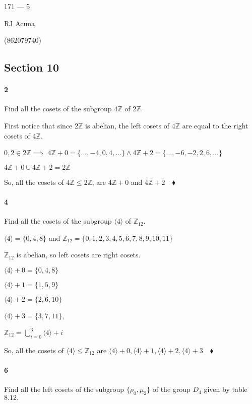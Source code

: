 \documentclass{article}
\newcommand\Z{\mathbb{Z}}
\begin{document}
\begin{center}
  171 --- 5

  RJ Acuna

  (862079740)
\end{center}\vspace{1.618em}


\subsection*{Section 10}

\paragraph{2} Find all the cosets of the subgroup $4\Z$ of $2\Z$.


First notice that since $2\Z$ is abelian, the left cosets
of $4\Z$ are equal to the right cosets of $4\Z$.

$0,2 \in 2\Z \implies$
$4\Z + 0 = \{\dots,-4, 0, 4, \dots\} \land 4\Z + 2 = \{\dots, -6 ,-2 , 2, 6,\dots\}$

$4\Z + 0 \cup 4\Z + 2  = 2\Z$

So, all the cosets of $4\Z\leq 2\Z$, are $4\Z + 0$ and $4\Z + 2 \quad \blacklozenge$

\paragraph{4} Find all the cosets of the subgroup $\langle 4 \rangle$
of $\Z_{12}$.


$\langle 4 \rangle = \{0,4,8\}$ and $\Z_{12} =
\{0,1,2,3,4,5,6,7,8,9,10,11\}$

$\Z_{12}$ is abelian, so left cosets are right cosets.

$\langle 4 \rangle + 0 = \{0, 4, 8\}$

$\langle 4 \rangle + 1 = \{1,5,9\}$

$\langle 4 \rangle + 2 = \{2,6,10\}$

$\langle 4 \rangle + 3 = \{3,7,11\}$,


$\Z_{12} = \bigcup_{i=0}^3 \langle  4 \rangle + i$

So, all the cosets of $\langle 4 \rangle \leq \Z_{12}$ are $\langle 4
\rangle + 0, \langle 4 \rangle + 1,\langle 4 \rangle + 2,\langle 4
\rangle + 3 \quad \blacklozenge$



\paragraph{6} Find all the left cosets of the subgroup
$\{\rho_0,\mu_2\}$ of the group $D_4$ given by table $8.12.$
\end{document}
